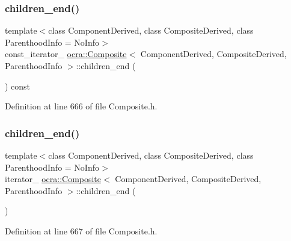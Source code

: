 \subsubsection{\texorpdfstring{children\+\_\+end()}{children\_end()}\hspace{0.1cm}{\footnotesize\ttfamily [1/2]}}
{\footnotesize\ttfamily template$<$class Component\+Derived, class Composite\+Derived, class Parenthood\+Info = No\+Info$>$ \\
const\+\_\+iterator\+\_\+ \hyperlink{classocra_1_1Composite}{ocra\+::\+Composite}$<$ Component\+Derived, Composite\+Derived, Parenthood\+Info $>$\+::children\+\_\+end (\begin{DoxyParamCaption}{ }\end{DoxyParamCaption}) const\hspace{0.3cm}{\ttfamily [inline]}}



Definition at line 666 of file Composite.\+h.

\hypertarget{classocra_1_1Composite_aea1639d5f852f80eb12266dcbb730a3b}{}\label{classocra_1_1Composite_aea1639d5f852f80eb12266dcbb730a3b} 
\subsubsection{\texorpdfstring{children\+\_\+end()}{children\_end()}\hspace{0.1cm}{\footnotesize\ttfamily [2/2]}}
{\footnotesize\ttfamily template$<$class Component\+Derived, class Composite\+Derived, class Parenthood\+Info = No\+Info$>$ \\
iterator\+\_\+ \hyperlink{classocra_1_1Composite}{ocra\+::\+Composite}$<$ Component\+Derived, Composite\+Derived, Parenthood\+Info $>$\+::children\+\_\+end (\begin{DoxyParamCaption}{ }\end{DoxyParamCaption})\hspace{0.3cm}{\ttfamily [inline]}}



Definition at line 667 of file Composite.\+h.

\hypertarget{classocra_1_1Composite_a6fed8be8a53ab9a5d3a3575a30ee70b9}{}\label{classocra_1_1Composite_a6fed8be8a53ab9a5d3a3575a30ee70b9} 
